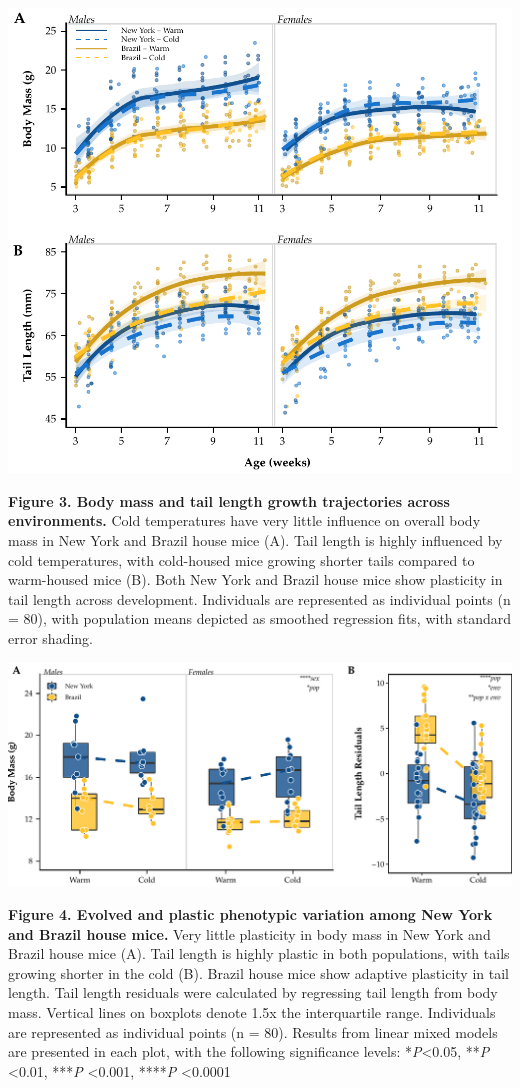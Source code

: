 \documentclass[]{article}
\begin{document}
\newpage

\includegraphics{../figures/weekly_phenotypes.pdf}

\textbf{Figure 3. Body mass and tail length growth trajectories across
environments.} Cold temperatures have very little influence on overall
body mass in New York and Brazil house mice (A). Tail length is highly
influenced by cold temperatures, with cold-housed mice growing shorter
tails compared to warm-housed mice (B). Both New York and Brazil house
mice show plasticity in tail length across development. Individuals are
represented as individual points (n = 80), with population means
depicted as smoothed regression fits, with standard error shading.

\newpage

\includegraphics{../figures/RXNs.pdf}

\textbf{Figure 4. Evolved and plastic phenotypic variation among New
York and Brazil house mice.} Very little plasticity in body mass in New
York and Brazil house mice (A). Tail length is highly plastic in both
populations, with tails growing shorter in the cold (B). Brazil house
mice show adaptive plasticity in tail length. Tail length residuals were
calculated by regressing tail length from body mass. Vertical lines on
boxplots denote 1.5x the interquartile range. Individuals are
represented as individual points (n = 80). Results from linear mixed
models are presented in each plot, with the following significance
levels: *\emph{P}\textless{}0.05, **\emph{P} \textless{}0.01,
***\emph{P} \textless{}0.001, ****\emph{P} \textless{}0.0001
\end{document}
